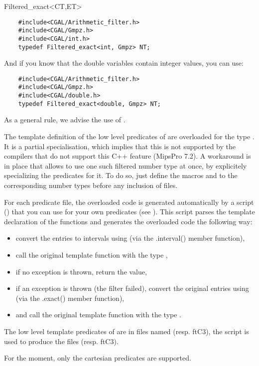 \begin{ccClass} {Filtered_exact<CT,ET>}
\begin{verbatim}
    #include<CGAL/Arithmetic_filter.h>
    #include<CGAL/Gmpz.h>
    #include<CGAL/int.h>
    typedef Filtered_exact<int, Gmpz> NT;
\end{verbatim}

And if you know that the double variables contain integer values, you can
use:

\begin{verbatim}
    #include<CGAL/Arithmetic_filter.h>
    #include<CGAL/Gmpz.h>
    #include<CGAL/double.h>
    typedef Filtered_exact<double, Gmpz> NT;
\end{verbatim}

As a general rule, we advise the use of
.

\ccImplementation

The template definition of the low level predicates of {\cgal} are overloaded
for the type .  It is a partial specialisation,
which implies that this is not supported by the compilers that do not support
this C++ feature (MipsPro 7.2).  A workaround is in place that allows to use
one such filtered number type at once, by explicitely specializing the
predicates for it.  To do so, just define the macros  and
 to the corresponding number types before any inclusion of
{\cgal} files.

For each predicate file, the overloaded code is generated automatically by a
 script
() that you can
use for your own predicates (see ).
This script parses the template declaration of the functions and generates the
overloaded code the following way:
\begin{itemize}
\item convert the entries to intervals using
     (via the .interval() member
    function),
\item call the original template function with the type
    ,
\item if no exception is thrown, return the value,
\item if an exception is thrown (the filter failed), convert the original
    entries using  (via the .exact() member function),
\item and call the original template function with the type .
\end{itemize}

\ccExample

The low level template predicates of {\cgal} are in files named
 (resp. ftC3), the script is used
to produce the files 
(resp. ftC3).

For the moment, only the cartesian predicates are supported.

\end{ccClass}
